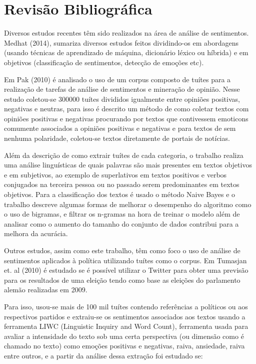 \chapter{Revisão Bibliográfica}

Diversos estudos recentes têm sido realizados na área de análise de sentimentos.
Medhat (2014)\citep{medhat2014}, sumariza diversos estudos feitos dividindo-os em
abordagens (usando técnicas de aprendizado de máquina, dicionário léxico ou
híbrida) e em objetivos (classificação de sentimentos, detecção de emoções etc).

Em Pak (2010)\citep{pak2010} é analisado o uso de um corpus composto de tuítes para
a realização de tarefas de análise de sentimentos e mineração de opinião. Nesse estudo
coletou-se 300000 tuítes divididos igualmente entre opiniões positivas, negativas e neutras, para
isso é descrito um método de como coletar textos com opiniões positivas e negativas procurando
por textos que contivessem emoticons comumente associados a opiniões positivas e negativas e para
textos de sem nenhuma polaridade, coletou-se textos diretamente de portais de notícias.

Além da descrição de como extrair tuítes de cada categoria, o trabalho realiza uma análise linguísticas
de quais palavras são mais presentes em textos objetivos e em subjetivos, ao exemplo de 
superlativos em textos positivos e verbos conjugados na terceira pessoa ou no passado serem 
predominantes em textos objetivos. Para a classificação dos textos é usado o método Naive Bayes e
o trabalho descreve algumas formas de melhorar o desempenho do algoritmo como o uso de bigramas,
e filtrar os n-gramas na hora de treinar o modelo além de analisar como o aumento do tamanho do 
conjunto de dados contribui para a melhora da acurácia. 

Outros estudos, assim como este trabalho, têm como foco o uso de análise de sentimentos
aplicados à política utilizando tuítes como o corpus. Em Tumasjan et. al (2010)\citep{tumasjan2010} é estudado
se é possível utilizar o Twitter para obter uma previsão para os resultados de uma eleição
tendo como base as eleições do parlamento alemão realizadas em 2009.

Para isso, usou-se mais de 100 mil tuítes contendo referências a políticos ou aos respectivos partidos
e extraiu-se os sentimentos associados aos textos usando a ferramenta LIWC (Linguistic Inquiry and
Word Count), ferramenta usada para avaliar a intensidade do texto sob uma certa perspectiva (ou 
dimensão como é chamado no texto) como emoções positivas e negativas, raiva, ansiedade, raiva entre
outros,
 e a partir da análise dessa extração foi estudado se:

